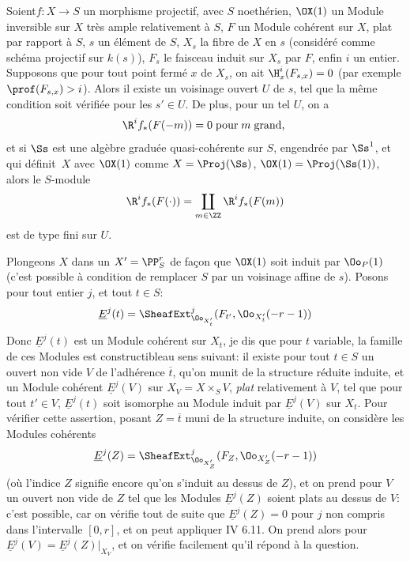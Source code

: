 \begin{proposition} \label{XII.1.5}
Soient\pageoriginaled $f:X\to S$ un morphisme projectif, avec $S$ noeth\'erien, $\OX(1)$ un Module inversible sur $X$ tr\`es ample relativement \`a $S$, $F$ un Module coh\'erent sur $X$, plat par rapport \`a $S$, $s$ un \'el\'ement de $S$, $X_s$ la fibre de $X$ en $s$ (consid\'er\'e comme sch\'ema projectif sur $k(s)$), $F_s$ le faisceau induit sur $X_s$ par $F$, enfin $i$ un entier. Supposons que pour tout point ferm\'e $x$ de $X_s$, on ait $\H^i_x(F_{s, x})=0$ (par exemple $\prof(F_{s, x})>i$). Alors il existe un voisinage ouvert $U$ de $s$, tel que la m\^eme condition soit v\'erifi\'ee pour les $s'\in U$. De plus, pour un tel $U$, on a
\[
\R^if_\ast(F(-m))= 0 \; \text{pour}\; m \; \text{grand, }
\]
et si $\Ss$ est une alg\`ebre gradu\'ee quasi-coh\'erente sur $S$, engendr\'ee par $\Ss^1$, et qui d\'efinit~$X$ avec $\OX(1)$ comme $X=\Proj(\Ss)$, $\OX(1)=\Proj(\Ss(1))$, alors le $S$-module
\[
\R^if_\ast(F(\cdot)) = \coprod_{m\in\ZZ}\R^if_\ast(F(m))
\]
est de type fini sur $U$.
\end{proposition}

Plongeons $X$ dans un $X'=\PP_S^r$ de fa\c con que $\OX(1)$ soit induit par $\Oo_{P}(1)$ (c'est possible \`a condition de remplacer $S$ par un voisinage affine de $s$). Posons\label{P5} pour tout entier $j$, et tout $t\in S$:
\steco
\begin{equation} \label{eq:XII.7} {}\underline{E}^j(t)= \SheafExt^j_{\Oo_{X'_t}} (F_{t'}, \Oo_{X'_t}(-r-1))
\end{equation}
Donc $\underline{E}^j(t)$ est un Module coh\'erent sur $X_t$, je dis que pour $t$ variable, la famille de ces Modules est \og constructible\fg au sens suivant: il existe pour tout $t\in S$ un ouvert non vide $V$ de l'adh\'erence $\overline{t}$, qu'on munit de la structure r\'eduite induite, et un Module coh\'erent $\underline{E}^j(V)$ sur $X_V=X\times_SV$, \emph{plat} relativement \`a $V$, tel que pour tout $t'\in V$, $\underline{E}^j(t)$ soit isomorphe au Module induit par $\underline{E}^j(V)$ sur $X_t$. Pour v\'erifier cette assertion, posant $Z=\overline{t}$ muni de la structure induite, on consid\`ere les Modules coh\'erents\pageoriginale
\[
\underline{E}^j(Z)= \SheafExt^j_{\Oo_{X'_Z}} (F_Z, \Oo_{X'_Z}(-r-1))
\]
(o\`u l'indice $Z$ signifie encore qu'on s'induit au dessus de $Z$), et on prend pour $V$ un ouvert non vide de $Z$ tel que les Modules $\underline{E}^j(Z)$ soient plats au dessus de $V$: c'est possible, car on v\'erifie tout de suite que $\underline{E}^j(Z)=0$ pour $j$ non compris dans l'intervalle $[0, r]$, et on peut appliquer  IV 6.11. On prend alors pour $\underline{E}^j(V)=\underline{E}^j(Z)|_{X_V}$, et on v\'erifie facilement qu'il r\'epond \`a la question.

